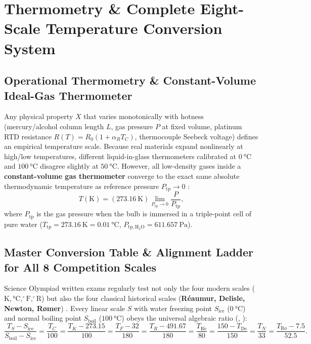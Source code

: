 \section{Thermometry \& Complete Eight-Scale Temperature Conversion System}
\label{sec:03.2}

\subsection{Operational Thermometry \& Constant-Volume Ideal-Gas Thermometer}
Any physical property $X$ that varies monotonically with hotness (mercury/alcohol column length $L$, gas pressure $P$ at fixed volume, platinum RTD resistance $R(T) = R_0(1 + \alpha_R T_C)$, thermocouple Seebeck voltage) defines an empirical temperature scale. Because real materials expand nonlinearly at high/low temperatures, different liquid-in-glass thermometers calibrated at $\SI{0}{\celsius}$ and $\SI{100}{\celsius}$ disagree slightly at $\SI{50}{\celsius}$. However, all low-density gases inside a \textbf{constant-volume gas thermometer} converge to the exact same absolute thermodynamic temperature as reference pressure $P_{\mathrm{tp}} \to 0$ :
\begin{equation}\label{eq:03:gastherm}
  T(\si{\kelvin}) = (\SI{273.16}{\kelvin}) \lim_{P_{\mathrm{tp}}\to 0} \frac{P}{P_{\mathrm{tp}}},
\end{equation}
where $P_{\mathrm{tp}}$ is the gas pressure when the bulb is immersed in a triple-point cell of pure water ($T_{\mathrm{tp}} = \SI{273.16}{\kelvin} = \SI{0.01}{\celsius}$, $P_{\mathrm{tp,H_2O}} = \SI{611.657}{\pascal}$).

\subsection{Master Conversion Table \& Alignment Ladder for All 8 Competition Scales}
Science Olympiad written exams regularly test not only the four modern scales ($\si{\kelvin}, \si{\celsius}, ^\circ\mathrm{F}, ^\circ\mathrm{R}$) but also the four classical historical scales (\textbf{R\'eaumur, Delisle, Newton, R\o mer}) . Every linear scale $S$ with water freezing point $S_{\mathrm{ice}}$ ($\SI{0}{\celsius}$) and normal boiling point $S_{\mathrm{boil}}$ ($\SI{100}{\celsius}$) obeys the universal algebraic ratio (, ):
\begin{equation}\label{eq:03:universalscale}
  \frac{T_S - S_{\mathrm{ice}}}{S_{\mathrm{boil}} - S_{\mathrm{ice}}} = \frac{T_C}{100} = \frac{T_K - 273.15}{100} = \frac{T_F - 32}{180} = \frac{T_R - 491.67}{180} = \frac{T_{\mathrm{R\acute{e}}}}{80} = \frac{150 - T_{\mathrm{De}}}{150} = \frac{T_N}{33} = \frac{T_{\text{R\o}} - 7.5}{52.5}.
\end{equation}

